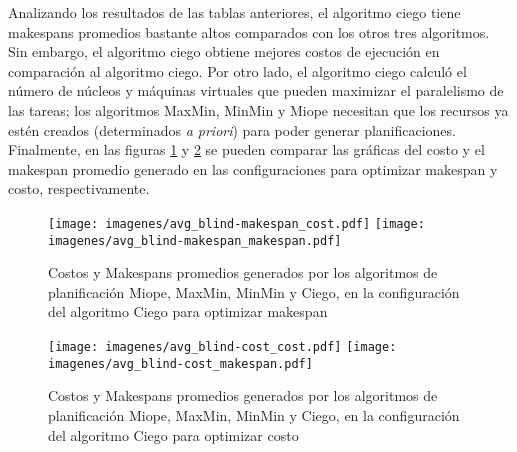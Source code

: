 Analizando los resultados de las tablas anteriores, el algoritmo ciego tiene makespans promedios bastante altos comparados con los otros tres algoritmos. Sin embargo, el algoritmo ciego obtiene mejores costos de ejecución en comparación al algoritmo ciego. Por otro lado, el algoritmo ciego calculó el número de núcleos y máquinas virtuales que pueden maximizar el paralelismo de las tareas; los algoritmos MaxMin, MinMin y Miope necesitan que los recursos ya estén creados (determinados \emph{a priori}) para poder generar planificaciones. Finalmente, en  las figuras \ref{fig:avg_blind_makespan} y \ref{fig:avg_blind_cost} se pueden comparar las gráficas del costo y el makespan promedio generado en las configuraciones para optimizar makespan y costo, respectivamente.


\begin{figure}
\begin{center}
\texttt{[image: imagenes/avg\_blind-makespan\_cost.pdf]}
\texttt{[image: imagenes/avg\_blind-makespan\_makespan.pdf]}
\end{center}
\caption{Costos y Makespans promedios generados por los algoritmos de planificación Miope, MaxMin, MinMin y Ciego, en la configuración del algoritmo Ciego para optimizar makespan}
\label{fig:avg_blind_makespan}
\end{figure}


\begin{figure}
\begin{center}
\texttt{[image: imagenes/avg\_blind-cost\_cost.pdf]}
\texttt{[image: imagenes/avg\_blind-cost\_makespan.pdf]}
\end{center}
\caption{Costos y Makespans promedios generados por los algoritmos de planificación Miope, MaxMin, MinMin y Ciego, en la configuración del algoritmo Ciego para optimizar costo}
\label{fig:avg_blind_cost}
\end{figure}
